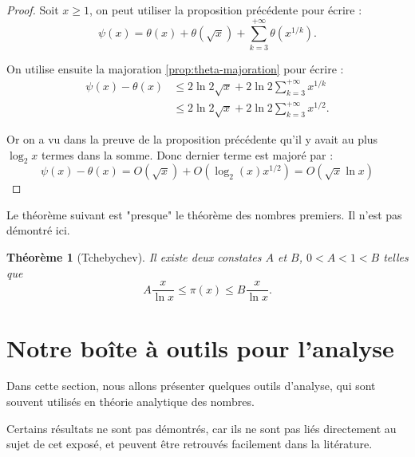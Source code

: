 \documentclass[french]{report}
\newtheorem{theorem}{Théorème}[section]
\begin{document}
\begin{proof}
  Soit $x\geq1$, on peut utiliser la proposition précédente pour écrire :
  \[
    \psi(x)
    = \theta(x) + \theta(\sqrt{x})
    + \sum_{k=3}^{+\infty}\theta(x^{1/k}).
  \]

  On utilise ensuite la majoration \ref{prop:theta-majoration} pour écrire :
  \begin{align*}
    \psi(x)-\theta(x)
    &\leq 2\ln2\sqrt{x}
    + 2\ln2\sum_{k=3}^{+\infty}x^{1/k} \\
    &\leq 2\ln2\sqrt{x}
    + 2\ln2\sum_{k=3}^{+\infty}x^{1/2}.
  \end{align*}

  Or on a vu dans la preuve de la proposition précédente qu'il y avait au plus $\log_2x$ termes dans la somme. Donc dernier terme est majoré par :
  \[
    \psi(x)-\theta(x)
    = O(\sqrt{x}) + O(\log_2(x)x^{1/2}) = O(\sqrt{x}\ln x)
  \]
\end{proof}

Le théorème suivant est "presque" le théorème des nombres premiers. Il n'est pas démontré ici.

\begin{theorem}[Tchebychev]
  Il existe deux constates $A$ et $B$, $0<A<1<B$ telles que
  \[
    A\frac{x}{\ln x}\leq\pi(x)\leq B\frac{x}{\ln x}.
  \]
\end{theorem}

\chapter{Notre boîte à outils pour l'analyse}

Dans cette section, nous allons présenter quelques outils d'analyse, qui sont souvent utilisés en théorie analytique des nombres.

Certains résultats ne sont pas démontrés, car ils ne sont pas liés directement au sujet de cet exposé, et peuvent être retrouvés facilement dans la litérature.

\end{document}
